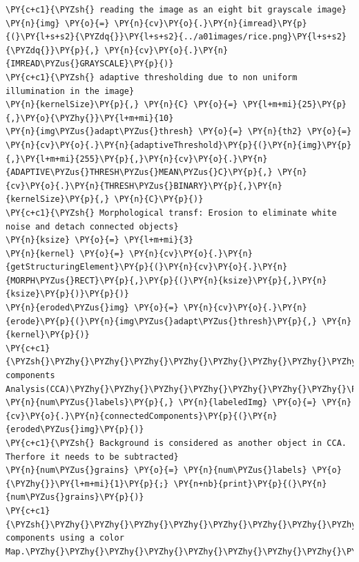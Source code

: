 \documentclass[a4paper,10pt]{article}%
\begin{document}
    \begin{tcolorbox}[breakable, size=fbox, boxrule=1pt, pad at break*=1mm,colback=cellbackground, colframe=cellborder]
\begin{Verbatim}[commandchars=\\\{\}]
\PY{c+c1}{\PYZsh{} reading the image as an eight bit grayscale image}
\PY{n}{img} \PY{o}{=} \PY{n}{cv}\PY{o}{.}\PY{n}{imread}\PY{p}{(}\PY{l+s+s2}{\PYZdq{}}\PY{l+s+s2}{../a01images/rice.png}\PY{l+s+s2}{\PYZdq{}}\PY{p}{,} \PY{n}{cv}\PY{o}{.}\PY{n}{IMREAD\PYZus{}GRAYSCALE}\PY{p}{)}
\PY{c+c1}{\PYZsh{} adaptive thresholding due to non uniform illumination in the image}
\PY{n}{kernelSize}\PY{p}{,} \PY{n}{C} \PY{o}{=} \PY{l+m+mi}{25}\PY{p}{,}\PY{o}{\PYZhy{}}\PY{l+m+mi}{10}
\PY{n}{img\PYZus{}adapt\PYZus{}thresh} \PY{o}{=} \PY{n}{th2} \PY{o}{=} \PY{n}{cv}\PY{o}{.}\PY{n}{adaptiveThreshold}\PY{p}{(}\PY{n}{img}\PY{p}{,}\PY{l+m+mi}{255}\PY{p}{,}\PY{n}{cv}\PY{o}{.}\PY{n}{ADAPTIVE\PYZus{}THRESH\PYZus{}MEAN\PYZus{}C}\PY{p}{,} \PY{n}{cv}\PY{o}{.}\PY{n}{THRESH\PYZus{}BINARY}\PY{p}{,}\PY{n}{kernelSize}\PY{p}{,} \PY{n}{C}\PY{p}{)}
\PY{c+c1}{\PYZsh{} Morphological transf: Erosion to eliminate white noise and detach connected objects}
\PY{n}{ksize} \PY{o}{=} \PY{l+m+mi}{3}
\PY{n}{kernel} \PY{o}{=} \PY{n}{cv}\PY{o}{.}\PY{n}{getStructuringElement}\PY{p}{(}\PY{n}{cv}\PY{o}{.}\PY{n}{MORPH\PYZus{}RECT}\PY{p}{,}\PY{p}{(}\PY{n}{ksize}\PY{p}{,}\PY{n}{ksize}\PY{p}{)}\PY{p}{)}
\PY{n}{eroded\PYZus{}img} \PY{o}{=} \PY{n}{cv}\PY{o}{.}\PY{n}{erode}\PY{p}{(}\PY{n}{img\PYZus{}adapt\PYZus{}thresh}\PY{p}{,} \PY{n}{kernel}\PY{p}{)}
\PY{c+c1}{\PYZsh{}\PYZhy{}\PYZhy{}\PYZhy{}\PYZhy{}\PYZhy{}\PYZhy{}\PYZhy{}\PYZhy{}\PYZhy{}\PYZhy{}\PYZhy{}\PYZhy{}\PYZhy{}\PYZhy{}\PYZhy{}\PYZhy{}\PYZhy{}Connected components Analysis(CCA)\PYZhy{}\PYZhy{}\PYZhy{}\PYZhy{}\PYZhy{}\PYZhy{}\PYZhy{}\PYZhy{}\PYZhy{}\PYZhy{}\PYZhy{}\PYZhy{}\PYZhy{}\PYZhy{}\PYZhy{}\PYZhy{}\PYZhy{}\PYZhy{}\PYZhy{}\PYZhy{}\PYZhy{}\PYZhy{}}
\PY{n}{num\PYZus{}labels}\PY{p}{,} \PY{n}{labeledImg} \PY{o}{=} \PY{n}{cv}\PY{o}{.}\PY{n}{connectedComponents}\PY{p}{(}\PY{n}{eroded\PYZus{}img}\PY{p}{)}
\PY{c+c1}{\PYZsh{} Background is considered as another object in CCA. Therfore it needs to be subtracted}
\PY{n}{num\PYZus{}grains} \PY{o}{=} \PY{n}{num\PYZus{}labels} \PY{o}{\PYZhy{}}\PY{l+m+mi}{1}\PY{p}{;} \PY{n+nb}{print}\PY{p}{(}\PY{n}{num\PYZus{}grains}\PY{p}{)}
\PY{c+c1}{\PYZsh{}\PYZhy{}\PYZhy{}\PYZhy{}\PYZhy{}\PYZhy{}\PYZhy{}\PYZhy{}\PYZhy{}\PYZhy{}\PYZhy{}\PYZhy{}\PYZhy{}\PYZhy{}\PYZhy{}\PYZhy{}\PYZhy{}\PYZhy{}Show components using a color Map.\PYZhy{}\PYZhy{}\PYZhy{}\PYZhy{}\PYZhy{}\PYZhy{}\PYZhy{}\PYZhy{}\PYZhy{}\PYZhy{}\PYZhy{}\PYZhy{}\PYZhy{}\PYZhy{}\PYZhy{}\PYZhy{}\PYZhy{}\PYZhy{}\PYZhy{}\PYZhy{}\PYZhy{}\PYZhy{}}

\end{Verbatim}
\end{tcolorbox}
\end{document}

